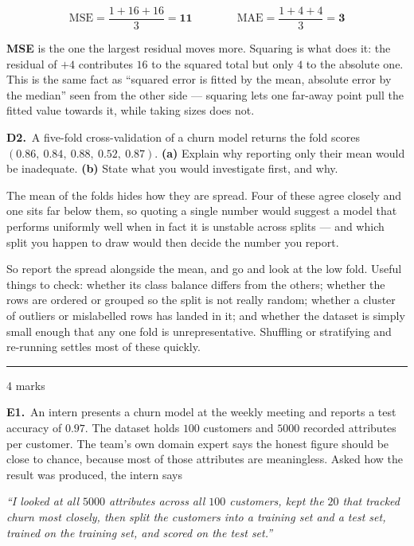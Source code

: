 \documentclass[10pt,a4paper]{article}
\newcommand{\parthead}[2]{\vspace{2pt}\noindent\rule{\linewidth}{0.4pt}\par\vspace{2pt}%
  \noindent{\bfseries Part #1}\hfill{\small #2}\par\vspace{1pt}}
\newcommand{\sol}[1]{\textbf{#1}}
\begin{document}
\[ \mathrm{MSE} = \frac{1 + 16 + 16}{3} = \sol{11} \qquad\qquad \mathrm{MAE} = \frac{1 + 4 + 4}{3} = \sol{3} \]

\sol{MSE} is the one the largest residual moves more. Squaring is what does it: the residual of $+4$ contributes $16$ to the squared total but only $4$ to the absolute one. This is the same fact as ``squared error is fitted by the mean, absolute error by the median'' seen from the other side --- squaring lets one far-away point pull the fitted value towards it, while taking sizes does not.

\vspace{6pt}

\textbf{D2.}\ A five-fold cross-validation of a churn model returns the fold scores $(0.86,\ 0.84,\ 0.88,\ 0.52,\ 0.87)$. \textbf{(a)} Explain why reporting only their mean would be inadequate. \textbf{(b)} State what you would investigate first, and why.

\vspace{2pt}

The mean of the folds hides how they are spread. Four of these agree closely and one sits far below them, so quoting a single number would suggest a model that performs uniformly well when in fact it is unstable across splits --- and which split you happen to draw would then decide the number you report.\par\vspace{1mm}So report the spread alongside the mean, and go and look at the low fold. Useful things to check: whether its class balance differs from the others; whether the rows are ordered or grouped so the split is not really random; whether a cluster of outliers or mislabelled rows has landed in it; and whether the dataset is simply small enough that any one fold is unrepresentative. Shuffling or stratifying and re-running settles most of these quickly.

\newpage

\parthead{E --- Reasoning}{4 marks}

\textbf{E1.}\ An intern presents a churn model at the weekly meeting and reports a test accuracy of $0.97$. The
dataset holds $100$ customers and $5000$ recorded attributes per customer. The team's own domain expert says
the honest figure should be close to chance, because most of those attributes are meaningless. Asked how the
result was produced, the intern says

\vspace{2mm}
\hspace*{6mm}\parbox{0.9\linewidth}{\emph{``I looked at all $5000$ attributes across all $100$ customers,
kept the $20$ that tracked churn most closely, then split the customers into a training set and a test set,
trained on the training set, and scored on the test set.''}}
\end{document}
